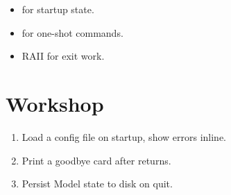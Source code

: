 \begin{recap}
\begin{itemize}[leftmargin=*]
  \item {} for startup state.
  \item {} for one-shot commands.
  \item RAII for exit work.
\end{itemize}
\end{recap}

\section*{Workshop}

\begin{enumerate}[leftmargin=*]
  \item Load a config file on startup, show errors inline.
  \item Print a goodbye card after  returns.
  \item Persist Model state to disk on quit.
\end{enumerate}
